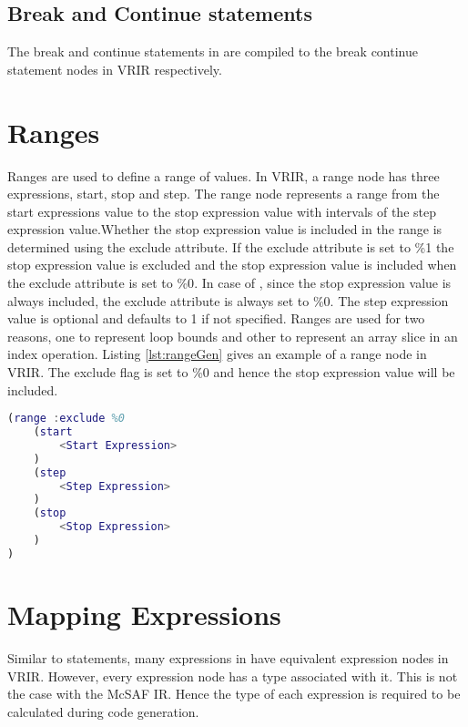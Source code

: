 \subsection{Break and Continue statements}
The break and continue statements in \matlab are compiled to the break continue statement nodes in VRIR respectively. 
\section{Ranges} 
\label{sec:range}
Ranges are used to define a range of values. In VRIR, a range node has three expressions, start, stop and step. The range node represents a range from the start expressions value to the stop expression value with intervals of the step expression value.Whether the stop expression value is included in the range is determined using the exclude attribute. If the exclude attribute is set to \textsf{\%1} the stop expression value is excluded and the stop expression value is included when the exclude attribute is set to \textsf{\%0}. In case of \matlab, since the stop expression value  is always included, the exclude attribute is always set to \textsf{\%0}. The step expression value is optional and defaults to 1 if not specified. Ranges are used for two reasons, one to represent loop bounds and other to represent an array slice in an index operation. Listing \ref{lst:rangeGen} gives an example of a range node in VRIR. The exclude flag is set to \textsf{\%0} and hence the stop expression value will be included. 
\begin{lstlisting}[float,language=matlab, label={lst:rangeGen}, caption={Example of a Range in VRIR}]
(range :exclude %0
	(start
		<Start Expression>
	)
	(step
		<Step Expression>		
    )
	(stop
		<Stop Expression>
	)
)
\end{lstlisting}
\section{Mapping Expressions}
Similar to statements, many expressions in \matlab have equivalent expression nodes in VRIR. However, every expression node has a type associated with it. This is not the case with the McSAF IR. Hence the type of each expression is required to be calculated during code generation. 
